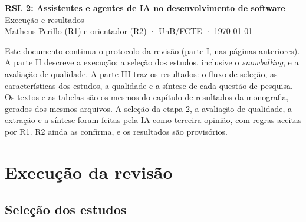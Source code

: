 

\usepackage{fixos/customizacoes}

\frenchspacing\openany
\pagestyle{simple}
\begin{center}
{\Large\bfseries RSL 2: Assistentes e agentes de IA no desenvolvimento de software}\\[6pt]
{\large Execução e resultados}\\[12pt]
Matheus Perillo (R1) e orientador (R2) · UnB/FCTE · \today
\end{center}
\vspace{12pt}
\noindent Este documento continua o protocolo da revisão (parte I, nas páginas anteriores). A parte II descreve a execução: a seleção dos estudos, inclusive o \textit{snowballing}, e a avaliação de qualidade. A parte III traz os resultados: o fluxo de seleção, as características dos estudos, a qualidade e a síntese de cada questão de pesquisa. Os textos e as tabelas são os mesmos do capítulo de resultados da monografia, gerados dos mesmos arquivos. A seleção da etapa 2, a avaliação de qualidade, a extração e a síntese foram feitas pela IA como terceira opinião, com regras aceitas por R1. R2 ainda as confirma, e os resultados são provisórios.

\chapter{Execução da revisão}
\section{Seleção dos estudos}
\label{sec:metodologia-selecao}
{\let\subsubsection\subsection }
{\let\subsection\section }
